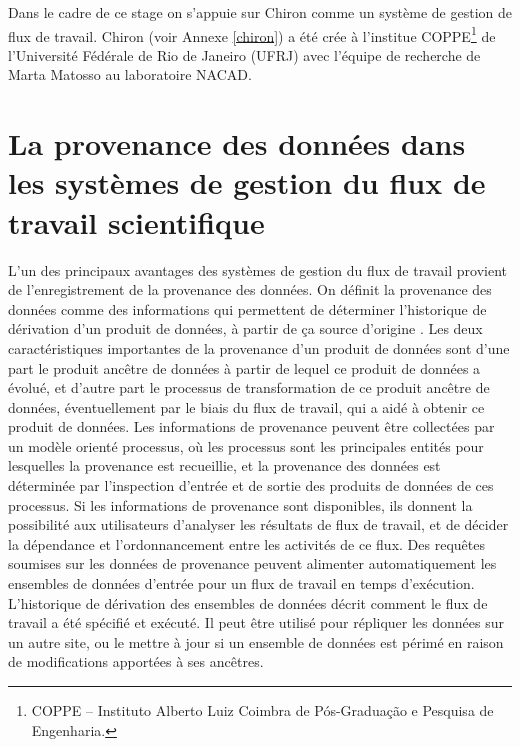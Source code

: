 
Dans le cadre de ce stage on s'appuie sur Chiron comme un système de gestion de flux de travail. Chiron (voir Annexe \ref{chiron}) a été crée à l'institue COPPE\footnote{COPPE – Instituto Alberto Luiz Coimbra de Pós-Graduação e Pesquisa de Engenharia.} de l'Université Fédérale de Rio de Janeiro (UFRJ)  avec l'équipe de recherche de Marta Matosso au laboratoire NACAD.
\vspace{0.5cm}
\section[La provenance des données]{La provenance des données dans les systèmes de gestion du flux de travail scientifique  }
L'un des principaux avantages des systèmes de gestion du flux de travail provient de l'enregistrement de la provenance des données. On définit la provenance des données comme des informations qui permettent de déterminer l'historique de dérivation d'un produit de données, à partir de ça source d'origine \cite{sim}. Les deux caractéristiques importantes de la provenance d'un produit de données sont d'une part le produit ancêtre de données à partir de lequel ce produit de données a évolué, et d'autre part le processus de transformation de ce produit ancêtre de données, éventuellement par le biais du flux de travail, qui a aidé à obtenir ce produit de données. Les informations de provenance peuvent être collectées par un modèle orienté processus, où les processus sont les principales entités pour lesquelles la provenance est recueillie, et la provenance des données est déterminée par l'inspection d'entrée et de sortie des produits de données de ces processus.
Si les informations de provenance sont disponibles, ils donnent la possibilité aux utilisateurs d'analyser les résultats de flux de travail, et de décider la dépendance et l'ordonnancement entre les activités de ce flux.
Des requêtes soumises sur les données de provenance peuvent alimenter automatiquement les ensembles de données d'entrée pour un flux de travail en temps d'exécution. L'historique de dérivation des ensembles de données décrit comment le flux de travail a été spécifié et exécuté. Il peut être utilisé pour répliquer les données sur un autre site, ou le mettre à jour si un ensemble de données est périmé en raison de modifications apportées à ses ancêtres.
\vspace{0.5cm}
